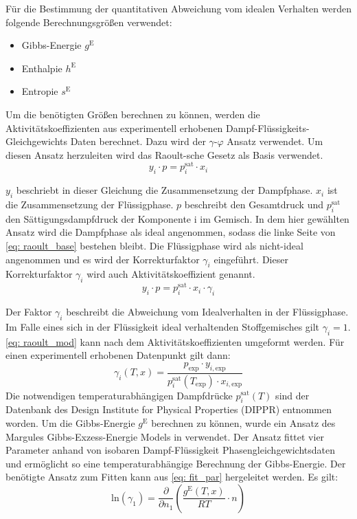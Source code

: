 \documentclass[../thesis.tex]{subfiles}
\begin{document}
Für die Bestimmung der quantitativen Abweichung vom idealen Verhalten werden folgende Berechnungsgrößen verwendet:
\begin{itemize}
	\item Gibbs-Energie $g^{\mathrm{E}}$
	\item Enthalpie $h^{\mathrm{E}}$
	\item Entropie $s^{\mathrm{E}}$
\end{itemize}

Um die benötigten Größen berechnen zu können, werden die Aktivitätskoeffizienten aus experimentell erhobenen Dampf-Flüssigkeits-Gleichgewichts Daten berechnet. Dazu wird der $\gamma$-$\varphi$ Ansatz verwendet. Um diesen Ansatz herzuleiten wird das Raoult-sche Gesetz als Basis verwendet.
\begin{equation}
	\label{eq: raoult_base}
	y_i \cdot p = p_{i}^{\mathrm{sat}} \cdot x_i
\end{equation}

$ y_i $ beschriebt in dieser Gleichung die Zusammensetzung der Dampfphase. $ x_i $ ist die Zusammensetzung der Flüssigphase. $ p $ beschreibt den Gesamtdruck und $ p_{i}^{\mathrm{sat}} $ den Sättigungsdampfdruck der Komponente i im Gemisch.
In dem hier gewählten Ansatz wird die Dampfphase als ideal angenommen, sodass die linke Seite von \autoref{eq: raoult_base} bestehen bleibt. Die Flüssigphase wird als nicht-ideal angenommen und es wird der Korrekturfaktor $\gamma_i$ eingeführt. Dieser Korrekturfaktor $\gamma_i$ wird auch Aktivitätskoeffizient genannt. 
\begin{equation}
	\label{eq: raoult_mod}
	y_i \cdot p = p_{i}^{\mathrm{sat}} \cdot x_i \cdot \gamma_i
\end{equation}

Der Faktor $\gamma_i$ beschreibt die Abweichung vom Idealverhalten in der Flüssigphase. Im Falle eines sich in der Flüssigkeit ideal verhaltenden Stoffgemisches gilt $\gamma_i = 1$. \autoref{eq: raoult_mod} kann nach dem Aktivitätskoeffizienten umgeformt werden. Für einen experimentell erhobenen Datenpunkt gilt dann:
\begin{equation}
	\gamma_i \left(T,x \right) = \dfrac{p_{\mathrm{exp}} \cdot y_{i,\mathrm{exp}}}{p_{i}^{\mathrm{sat}}(T_{\mathrm{exp}}) \cdot x_{i,\mathrm{exp}}}
\end{equation}
Die notwendigen temperaturabhängigen Dampfdrücke $p_{i}^{\mathrm{sat}}(T)$ sind der Datenbank des Design Institute for Physical Properties (DIPPR) \cite{thomson1996dippr} entnommen worden.
Um die Gibbs-Energie $g^{\mathrm{E}}$ berechnen zu können, wurde ein Ansatz des Margules Gibbs-Exzess-Energie Models in \cite{jaubert2020benchmark} verwendet. Der Ansatz fittet vier Parameter anhand von isobaren Dampf-Flüssigkeit Phasengleichgewichtsdaten und ermöglicht so eine temperaturabhängige Berechnung der Gibbs-Energie. Der benötigte Ansatz zum Fitten kann aus \autoref{eq: fit_par} hergeleitet werden. Es gilt:
\begin{equation}
	\label{eq: fit_par}
	\mathrm{ln}(\gamma_1) =  \dfrac{\partial }{\partial n_1} \left( \dfrac{g^{\mathrm{E}}(T,x)}{RT} \cdot n \right)
\end{equation}
\end{document}
